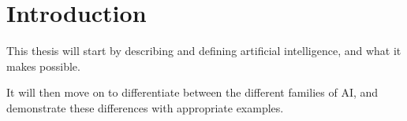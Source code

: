\chapter{Introduction}
This thesis will start by describing and defining artificial intelligence, and what it makes possible. 

It will then move on to differentiate between the different families of AI, and demonstrate these differences with appropriate examples.